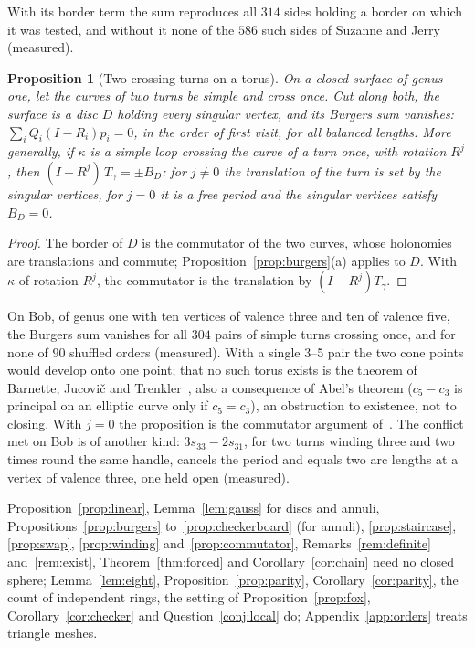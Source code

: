 \documentclass[11pt,a4paper]{article}
\newtheorem{proposition}{Proposition}
\newcommand{\shift}{s}
\begin{document}
With its border term the sum reproduces all $314$ sides holding a border on
which it was tested, and without it none of the $586$ such sides of Suzanne
and Jerry (measured).

\begin{proposition}[Two crossing turns on a torus]\label{prop:torus}
On a closed surface of genus one, let the curves of two turns be simple and
cross once. Cut along both, the surface is a disc $D$ holding every singular
vertex, and its Burgers sum vanishes: $\sum_i Q_i (I - R_i) p_i = 0$, in the
order of first visit, for all balanced lengths. More generally, if $\kappa$ is
a simple loop crossing the curve of a turn once, with rotation $R^j$, then $(I
- R^j)\,T_\gamma = \pm B_D$: for $j \neq 0$ the translation of the turn is set
by the singular vertices, for $j = 0$ it is a free period and the singular
vertices satisfy $B_D = 0$.
\end{proposition}
\begin{proof}
The border of $D$ is the commutator of the two curves, whose holonomies are
translations and commute; Proposition~\ref{prop:burgers}(a) applies to $D$.
With $\kappa$ of rotation $R^j$, the commutator is the translation by $(I -
R^j)T_\gamma$.
\end{proof}

On Bob, of genus one with ten vertices of valence three and ten of valence
five, the Burgers sum vanishes for all $304$ pairs of simple turns crossing
once, and for none of $90$ shuffled orders (measured). With a single 3--5
pair the two cone points would develop onto one point; that no such torus
exists is the theorem of Barnette, Jucovi\v{c} and
Trenkler~\cite{barnette1971toroidal}, also a consequence of Abel's theorem
($c_5 - c_3$ is principal on an elliptic curve only if $c_5 = c_3$), an
obstruction to existence, not to closing. With $j = 0$ the proposition is the
commutator argument of~\cite[\S7]{izmestiev2013torus}. The conflict met on
Bob is of another kind: $3\shift_{33} - 2\shift_{31}$, for two turns winding
three and two times round the same handle, cancels the period and equals two
arc lengths at a vertex of valence three, one held open (measured).

Proposition~\ref{prop:linear}, Lemma~\ref{lem:gauss} for discs and annuli,
Propositions~\ref{prop:burgers} to~\ref{prop:checkerboard} (for annuli),
\ref{prop:staircase}, \ref{prop:swap}, \ref{prop:winding}
and~\ref{prop:commutator}, Remarks~\ref{rem:definite} and~\ref{rem:exist},
Theorem~\ref{thm:forced} and Corollary~\ref{cor:chain} need no closed sphere;
Lemma~\ref{lem:eight}, Proposition~\ref{prop:parity},
Corollary~\ref{cor:parity}, the count of independent rings, the setting of
Proposition~\ref{prop:fox}, Corollary~\ref{cor:checker} and
Question~\ref{conj:local} do; Appendix~\ref{app:orders} treats triangle
meshes.
\end{document}
